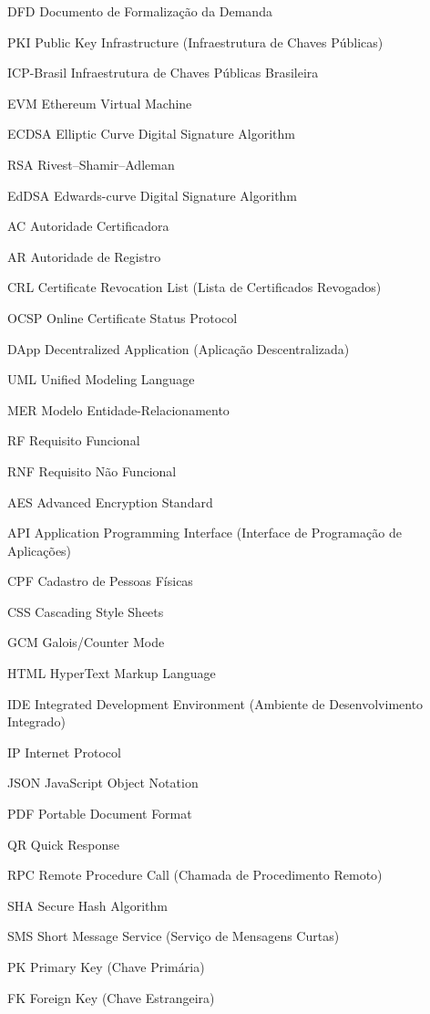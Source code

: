 \documentclass[
    12pt,
    a4paper,
    oneside,
    chapter=TITLE,
    section=TITLE,
    subsection=TITLE,
    subsubsection=TITLE,
    sumario=tradicional,
    english,
    brazil
]{abntex2}
\newcommand{\listofquadrosname}{Lista de quadros}
\begin{document}
\listoffigures*
\cleardoublepage

\pdfbookmark[0]{\listofquadrosname}{loq}
\listofquadros*
\cleardoublepage

\begin{siglas}
    \item[DFD] Documento de Formalização da Demanda
    \item[PKI] Public Key Infrastructure (Infraestrutura de Chaves Públicas)
    \item[ICP-Brasil] Infraestrutura de Chaves Públicas Brasileira
    \item[EVM] Ethereum Virtual Machine
    \item[ECDSA] Elliptic Curve Digital Signature Algorithm
    \item[RSA] Rivest--Shamir--Adleman
    \item[EdDSA] Edwards-curve Digital Signature Algorithm
    \item[AC] Autoridade Certificadora
    \item[AR] Autoridade de Registro
    \item[CRL] Certificate Revocation List (Lista de Certificados Revogados)
    \item[OCSP] Online Certificate Status Protocol
    \item[DApp] Decentralized Application (Aplicação Descentralizada)
    \item[UML] Unified Modeling Language
    \item[MER] Modelo Entidade-Relacionamento
    \item[RF] Requisito Funcional
    \item[RNF] Requisito Não Funcional
    \item[AES] Advanced Encryption Standard
    \item[API] Application Programming Interface (Interface de Programação de Aplicações)
    \item[CPF] Cadastro de Pessoas Físicas
    \item[CSS] Cascading Style Sheets
    \item[GCM] Galois/Counter Mode
    \item[HTML] HyperText Markup Language
    \item[IDE] Integrated Development Environment (Ambiente de Desenvolvimento Integrado)
    \item[IP] Internet Protocol
    \item[JSON] JavaScript Object Notation
    \item[PDF] Portable Document Format
    \item[QR] Quick Response
    \item[RPC] Remote Procedure Call (Chamada de Procedimento Remoto)
    \item[SHA] Secure Hash Algorithm
    \item[SMS] Short Message Service (Serviço de Mensagens Curtas)
    \item[PK] Primary Key (Chave Primária)
    \item[FK] Foreign Key (Chave Estrangeira)
\end{siglas}
\end{document}
